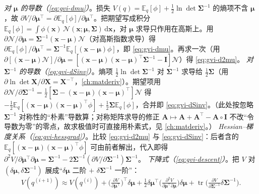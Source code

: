 \begin{derivation}
\label{der:nlopt-gvi-deriv}
\emph{对 $\boldsymbol{\mu}$ 的导数（\cref{eq:gvi-dmu}）}。损失 $V(q)=\mathbb{E}_q[\phi]+\tfrac12\ln\det\boldsymbol{\Sigma}^{-1}$ 的熵项不含 $\boldsymbol{\mu}$，故 $\partial V/\partial\boldsymbol{\mu}^\top=\partial\mathbb{E}_q[\phi]/\partial\boldsymbol{\mu}^\top$。把期望写成积分 $\mathbb{E}_q[\phi]=\int\phi(\mathbf{x})\,\mathcal{N}(\mathbf{x};\boldsymbol{\mu},\boldsymbol{\Sigma})\,\mathrm{d}\mathbf{x}$，对 $\boldsymbol{\mu}$ 求导只作用在高斯上。用 $\partial\mathcal{N}/\partial\boldsymbol{\mu}=\boldsymbol{\Sigma}^{-1}(\mathbf{x}-\boldsymbol{\mu})\mathcal{N}$（对高斯指数求导）得 $\partial\mathbb{E}_q[\phi]/\partial\boldsymbol{\mu}^\top=\boldsymbol{\Sigma}^{-1}\mathbb{E}_q[(\mathbf{x}-\boldsymbol{\mu})\phi]$，即 \cref{eq:gvi-dmu}。再求一次（用 $\partial[(\mathbf{x}-\boldsymbol{\mu})\mathcal{N}]/\partial\boldsymbol{\mu}=[(\mathbf{x}-\boldsymbol{\mu})(\mathbf{x}-\boldsymbol{\mu})^\top\boldsymbol{\Sigma}^{-1}-\mathbf{I}]\mathcal{N}$）得 \cref{eq:gvi-d2mu}。
\emph{对 $\boldsymbol{\Sigma}^{-1}$ 的导数（\cref{eq:gvi-dSinv}）}。熵项 $\tfrac12\ln\det\boldsymbol{\Sigma}^{-1}$ 对 $\boldsymbol{\Sigma}^{-1}$ 求导给 $\tfrac12\boldsymbol{\Sigma}$（用 $\partial\ln\det\mathbf{X}/\partial\mathbf{X}=\mathbf{X}^{-\top}$，\cref{ch:matderiv}）。期望项用 $\partial\mathcal{N}/\partial\boldsymbol{\Sigma}^{-1}=\tfrac12[\boldsymbol{\Sigma}-(\mathbf{x}-\boldsymbol{\mu})(\mathbf{x}-\boldsymbol{\mu})^\top]\mathcal{N}$ 得 $-\tfrac12\mathbb{E}_q[(\mathbf{x}-\boldsymbol{\mu})(\mathbf{x}-\boldsymbol{\mu})^\top\phi]+\tfrac12\boldsymbol{\Sigma}\mathbb{E}_q[\phi]$，合并即 \cref{eq:gvi-dSinv}。（此处按忽略 $\boldsymbol{\Sigma}^{-1}$ 对称性的“朴素”导数算；对称矩阵求导的修正 $\mathbf{A}\mapsto\mathbf{A}+\mathbf{A}^\top-\mathbf{A}\circ\mathbf{I}$ 不改“令导数为零”的零点，故求极值时可直接用朴素式，见 \cref{ch:matderiv}。）
\emph{Hessian--梯度关系（\cref{eq:gvi-hessgrad}）}。比较 \cref{eq:gvi-d2mu} 与 \cref{eq:gvi-dSinv}：后者含的 $\mathbb{E}_q[(\mathbf{x}-\boldsymbol{\mu})(\mathbf{x}-\boldsymbol{\mu})^\top\phi]$ 可由前者解出，代入即得 $\partial^2 V/\partial\boldsymbol{\mu}^\top\partial\boldsymbol{\mu}=\boldsymbol{\Sigma}^{-1}-2\boldsymbol{\Sigma}^{-1}(\partial V/\partial\boldsymbol{\Sigma}^{-1})\boldsymbol{\Sigma}^{-1}$。
\emph{下降式（\cref{eq:gvi-descent}）}。把 $V$ 对 $(\delta\boldsymbol{\mu},\delta\boldsymbol{\Sigma}^{-1})$ 展成“$\delta\boldsymbol{\mu}$ 二阶 $+$ $\delta\boldsymbol{\Sigma}^{-1}$ 一阶”：
\[
  V(q^{(i+1)})\approx V(q^{(i)})+\Big(\tfrac{\partial V}{\partial\boldsymbol{\mu}^\top}\Big)^\top\delta\boldsymbol{\mu}+\tfrac12\delta\boldsymbol{\mu}^\top\Big(\tfrac{\partial^2 V}{\partial\boldsymbol{\mu}^\top\partial\boldsymbol{\mu}}\Big)\delta\boldsymbol{\mu}+\operatorname{tr}\!\Big(\tfrac{\partial V}{\partial\boldsymbol{\Sigma}^{-1}}\delta\boldsymbol{\Sigma}^{-1}\Big).
\]
\end{derivation}
